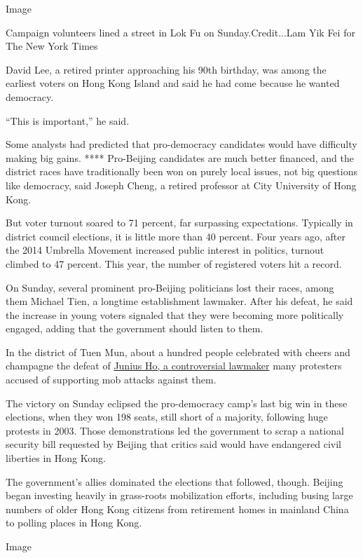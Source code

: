 Image

Campaign volunteers lined a street in Lok Fu on Sunday.Credit...Lam Yik
Fei for The New York Times

David Lee, a retired printer approaching his 90th birthday, was among
the earliest voters on Hong Kong Island and said he had come because he
wanted democracy.

``This is important,'' he said.

Some analysts had predicted that pro-democracy candidates would have
difficulty making big gains. **** Pro-Beijing candidates are much better
financed, and the district races have traditionally been won on purely
local issues, not big questions like democracy, said Joseph Cheng, a
retired professor at City University of Hong Kong.

But voter turnout soared to 71 percent, far surpassing expectations.
Typically in district council elections, it is little more than 40
percent. Four years ago, after the 2014 Umbrella Movement increased
public interest in politics, turnout climbed to 47 percent. This year,
the number of registered voters hit a record.

On Sunday, several prominent pro-Beijing politicians lost their races,
among them Michael Tien, a longtime establishment lawmaker. After his
defeat, he said the increase in young voters signaled that they were
becoming more politically engaged, adding that the government should
listen to them.

In the district of Tuen Mun, about a hundred people celebrated with
cheers and champagne the defeat of
\href{https://www.nytimes3xbfgragh.onion/2019/11/05/world/asia/junius-ho-stabbed-hong-kong.html}{Junius
Ho, a controversial lawmaker} many protesters accused of supporting mob
attacks against them.

The victory on Sunday eclipsed the pro-democracy camp's last big win in
these elections, when they won 198 seats, still short of a majority,
following huge protests in 2003. Those demonstrations led the government
to scrap a national security bill requested by Beijing that critics said
would have endangered civil liberties in Hong Kong.

The government's allies dominated the elections that followed, though.
Beijing began investing heavily in grass-roots mobilization efforts,
including busing large numbers of older Hong Kong citizens from
retirement homes in mainland China to polling places in Hong Kong.

Image

